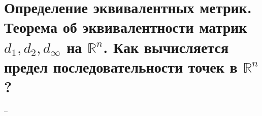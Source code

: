 \section{Определение эквивалентных метрик. Теорема об эквивалентности матрик $d_1, d_2, d_{\infty}$ на $\mathbb{R}^n$. Как вычисляется предел последовательности точек в $\mathbb{R}^n$?}
--
\newline